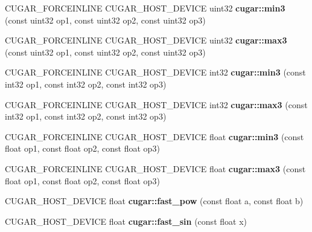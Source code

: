 \begin{DoxyCompactItemize}
C\+U\+G\+A\+R\+\_\+\+F\+O\+R\+C\+E\+I\+N\+L\+I\+NE C\+U\+G\+A\+R\+\_\+\+H\+O\+S\+T\+\_\+\+D\+E\+V\+I\+CE uint32 {\bfseries cugar\+::min3} (const uint32 op1, const uint32 op2, const uint32 op3)
\item 
\mbox{\label{group___basic_gaec8030157ec8b01c84a84ba0e5d8ae14}} 
C\+U\+G\+A\+R\+\_\+\+F\+O\+R\+C\+E\+I\+N\+L\+I\+NE C\+U\+G\+A\+R\+\_\+\+H\+O\+S\+T\+\_\+\+D\+E\+V\+I\+CE uint32 {\bfseries cugar\+::max3} (const uint32 op1, const uint32 op2, const uint32 op3)
\item 
\mbox{\label{group___basic_ga44a3aabd32f8a51212381c1dc9e1774d}} 
C\+U\+G\+A\+R\+\_\+\+F\+O\+R\+C\+E\+I\+N\+L\+I\+NE C\+U\+G\+A\+R\+\_\+\+H\+O\+S\+T\+\_\+\+D\+E\+V\+I\+CE int32 {\bfseries cugar\+::min3} (const int32 op1, const int32 op2, const int32 op3)
\item 
\mbox{\label{group___basic_ga87c9d41dacebc66e6f4277513d794bae}} 
C\+U\+G\+A\+R\+\_\+\+F\+O\+R\+C\+E\+I\+N\+L\+I\+NE C\+U\+G\+A\+R\+\_\+\+H\+O\+S\+T\+\_\+\+D\+E\+V\+I\+CE int32 {\bfseries cugar\+::max3} (const int32 op1, const int32 op2, const int32 op3)
\item 
\mbox{\label{group___basic_gacca5d52130b661865260fdb840bdf96f}} 
C\+U\+G\+A\+R\+\_\+\+F\+O\+R\+C\+E\+I\+N\+L\+I\+NE C\+U\+G\+A\+R\+\_\+\+H\+O\+S\+T\+\_\+\+D\+E\+V\+I\+CE float {\bfseries cugar\+::min3} (const float op1, const float op2, const float op3)
\item 
\mbox{\label{group___basic_ga1e731646dea069a3a93db267f0bd35f8}} 
C\+U\+G\+A\+R\+\_\+\+F\+O\+R\+C\+E\+I\+N\+L\+I\+NE C\+U\+G\+A\+R\+\_\+\+H\+O\+S\+T\+\_\+\+D\+E\+V\+I\+CE float {\bfseries cugar\+::max3} (const float op1, const float op2, const float op3)
\item 
\mbox{\label{group___basic_ga2647e541424f414f89bd7f0e8ded4715}} 
C\+U\+G\+A\+R\+\_\+\+H\+O\+S\+T\+\_\+\+D\+E\+V\+I\+CE float {\bfseries cugar\+::fast\+\_\+pow} (const float a, const float b)
\item 
\mbox{\label{group___basic_ga186749bf76f989874cb6c767789e584a}} 
C\+U\+G\+A\+R\+\_\+\+H\+O\+S\+T\+\_\+\+D\+E\+V\+I\+CE float {\bfseries cugar\+::fast\+\_\+sin} (const float x)
\item 

\end{DoxyCompactItemize}
